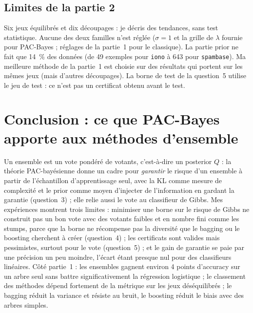 \documentclass[11pt,a4paper]{article}
\begin{document}
\subsection{Limites de la partie 2}
Six jeux équilibrés et dix découpages : je décris des tendances, sans test statistique. Aucune des deux familles n'est réglée ($\sigma=1$ et la grille de $\lambda$ fournie pour PAC-Bayes ; réglages de la partie~1 pour le classique). La partie prior ne fait que 14~\% des données (de 49 exemples pour \texttt{iono} à 643 pour \texttt{spambase}).
Ma \og meilleure méthode de la partie~1\fg{} est choisie sur des résultats qui portent sur les mêmes jeux (mais d'autres découpages). La borne \og de test\fg{} de la question~5 utilise le jeu de test : ce n'est pas un certificat obtenu avant le test.

\section{Conclusion : ce que PAC-Bayes apporte aux méthodes d'ensemble}
Un ensemble est un vote pondéré de votants, c'est-à-dire un posterior $Q$ : la théorie PAC-bayésienne donne un cadre pour \emph{garantir} le risque d'un ensemble à partir de l'échantillon d'apprentissage seul, avec la KL comme mesure de complexité et le prior comme moyen d'injecter de l'information en gardant la garantie (question~3) ; elle relie aussi le vote au classifieur de Gibbs.
Mes expériences montrent trois limites : minimiser une borne sur le risque de Gibbs ne construit pas un bon vote avec des votants faibles et en nombre fini comme les stumps, parce que la borne ne récompense pas la diversité que le bagging ou le boosting cherchent à créer (question~4) ; les certificats sont valides mais pessimistes, surtout pour le vote (question~5) ; et le gain de garantie se paie par une précision un peu moindre, l'écart étant presque nul pour des classifieurs linéaires.
Côté partie~1 : les ensembles gagnent environ 4 points d'accuracy sur un arbre seul sans battre significativement la régression logistique ; le classement des méthodes dépend fortement de la métrique sur les jeux déséquilibrés ; le bagging réduit la variance et résiste au bruit, le boosting réduit le biais avec des arbres simples.
\end{document}
